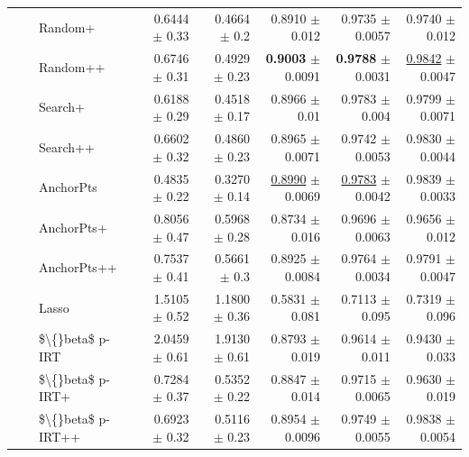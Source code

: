 \begin{longtable}{llp{}rrrrr}
 &  & Random+ & 0.6444 {\scriptsize $\pm$ 0.33} & 0.4664 {\scriptsize $\pm$ 0.2} & 0.8910 {\scriptsize $\pm$ 0.012} & 0.9735 {\scriptsize $\pm$ 0.0057} & 0.9740 {\scriptsize $\pm$ 0.012} \\
 &  & Random++ & 0.6746 {\scriptsize $\pm$ 0.31} & 0.4929 {\scriptsize $\pm$ 0.23} & \textbf{0.9003} {\scriptsize $\pm$ 0.0091} & \textbf{0.9788} {\scriptsize $\pm$ 0.0031} & \underline{0.9842} {\scriptsize $\pm$ 0.0047} \\
 &  & Search+ & 0.6188 {\scriptsize $\pm$ 0.29} & 0.4518 {\scriptsize $\pm$ 0.17} & 0.8966 {\scriptsize $\pm$ 0.01} & 0.9783 {\scriptsize $\pm$ 0.004} & 0.9799 {\scriptsize $\pm$ 0.0071} \\
 &  & Search++ & 0.6602 {\scriptsize $\pm$ 0.32} & 0.4860 {\scriptsize $\pm$ 0.23} & 0.8965 {\scriptsize $\pm$ 0.0071} & 0.9742 {\scriptsize $\pm$ 0.0053} & 0.9830 {\scriptsize $\pm$ 0.0044} \\
 &  & AnchorPts & 0.4835 {\scriptsize $\pm$ 0.22} & 0.3270 {\scriptsize $\pm$ 0.14} & \underline{0.8990} {\scriptsize $\pm$ 0.0069} & \underline{0.9783} {\scriptsize $\pm$ 0.0042} & 0.9839 {\scriptsize $\pm$ 0.0033} \\
 &  & AnchorPts+ & 0.8056 {\scriptsize $\pm$ 0.47} & 0.5968 {\scriptsize $\pm$ 0.28} & 0.8734 {\scriptsize $\pm$ 0.016} & 0.9696 {\scriptsize $\pm$ 0.0063} & 0.9656 {\scriptsize $\pm$ 0.012} \\
 &  & AnchorPts++ & 0.7537 {\scriptsize $\pm$ 0.41} & 0.5661 {\scriptsize $\pm$ 0.3} & 0.8925 {\scriptsize $\pm$ 0.0084} & 0.9764 {\scriptsize $\pm$ 0.0034} & 0.9791 {\scriptsize $\pm$ 0.0047} \\
 &  & Lasso & 1.5105 {\scriptsize $\pm$ 0.52} & 1.1800 {\scriptsize $\pm$ 0.36} & 0.5831 {\scriptsize $\pm$ 0.081} & 0.7113 {\scriptsize $\pm$ 0.095} & 0.7319 {\scriptsize $\pm$ 0.096} \\
 &  & \$\textbackslash\{\}beta\$ p-IRT & 2.0459 {\scriptsize $\pm$ 0.61} & 1.9130 {\scriptsize $\pm$ 0.61} & 0.8793 {\scriptsize $\pm$ 0.019} & 0.9614 {\scriptsize $\pm$ 0.011} & 0.9430 {\scriptsize $\pm$ 0.033} \\
 &  & \$\textbackslash\{\}beta\$ p-IRT+ & 0.7284 {\scriptsize $\pm$ 0.37} & 0.5352 {\scriptsize $\pm$ 0.22} & 0.8847 {\scriptsize $\pm$ 0.014} & 0.9715 {\scriptsize $\pm$ 0.0065} & 0.9630 {\scriptsize $\pm$ 0.019} \\
 &  & \$\textbackslash\{\}beta\$ p-IRT++ & 0.6923 {\scriptsize $\pm$ 0.32} & 0.5116 {\scriptsize $\pm$ 0.23} & 0.8954 {\scriptsize $\pm$ 0.0096} & 0.9749 {\scriptsize $\pm$ 0.0055} & 0.9838 {\scriptsize $\pm$ 0.0054} \\

\end{longtable}
